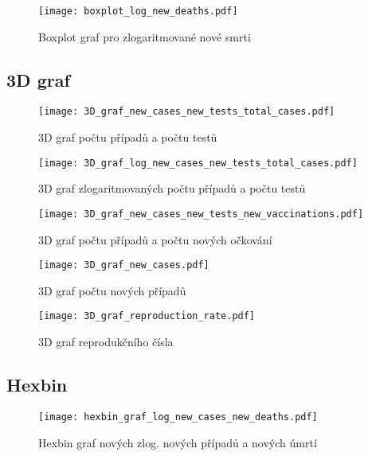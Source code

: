 \documentclass[a4paper]{ article}
\begin{document}
\begin{figure}[H]
\centering

\texttt{[image: boxplot\_log\_new\_deaths.pdf]}
\caption{Boxplot graf pro zlogaritmované nové smrti}
\end{figure}

\subsection{3D graf}
\begin{figure}[H]
\centering

\texttt{[image: 3D\_graf\_new\_cases\_new\_tests\_total\_cases.pdf]}
\caption{3D graf počtu případů a počtu testů}

\texttt{[image: 3D\_graf\_log\_new\_cases\_new\_tests\_total\_cases.pdf]}
\caption{3D graf zlogaritmovaných počtu případů a počtu testů}

\end{figure}
\begin{figure}[H]

\texttt{[image: 3D\_graf\_new\_cases\_new\_tests\_new\_vaccinations.pdf]}
\caption{3D graf počtu případů a počtu nových očkování}

\texttt{[image: 3D\_graf\_new\_cases.pdf]}
\caption{3D graf počtu nových případů}

\end{figure}
\begin{figure}[H]

\texttt{[image: 3D\_graf\_reproduction\_rate.pdf]}
\caption{3D graf reprodukčního čísla}

\end{figure}

\subsection{Hexbin}
\begin{figure}[H]
\centering

\texttt{[image: hexbin\_graf\_log\_new\_cases\_new\_deaths.pdf]}
\caption{Hexbin graf nových zlog. nových případů a nových úmrtí}

\end{figure}
\clearpage
\end{document}
